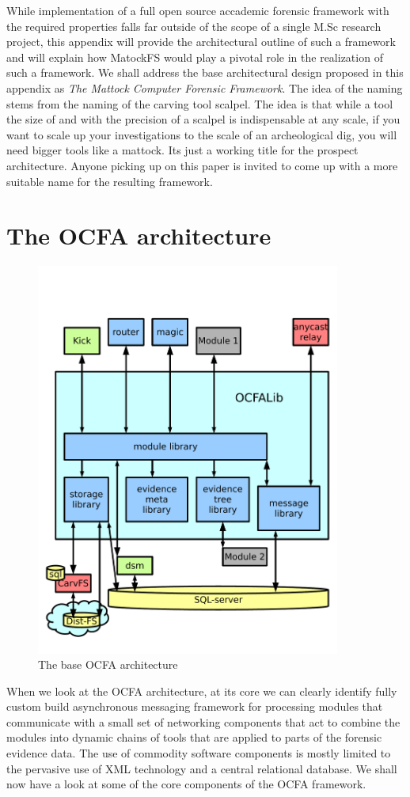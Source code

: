 While implementation of a full open source accademic forensic framework with the required properties falls far outside of the scope of a single M.Sc research project, this appendix will provide the architectural outline of such a framework and will explain how MatockFS would play a pivotal role in the realization of such a framework. We shall address the base architectural design proposed in this appendix as \emph{The Mattock Computer Forensic Framework}. The idea of the naming stems from the naming of the carving tool scalpel. The idea is that while a tool the size of and with the precision of a scalpel is indispensable at any scale, if you want to scale up your investigations to the scale of an archeological dig, you will need bigger tools like a mattock. Its just a working title for the prospect architecture. Anyone picking up on this paper is invited to come up with a more suitable name for the resulting framework. 
\section{The OCFA architecture}
\begin{figure}
\centering
\includegraphics[width=100mm]{mattock/libraryview.pdf}
\caption{The base OCFA architecture}
\label{fig:FlowInOut}
\end{figure}
When we look at the OCFA architecture, at its core we can clearly identify fully custom build asynchronous messaging framework for processing modules that communicate with a small set of networking components that act to combine the modules into dynamic chains of tools that are applied to parts of the forensic evidence data. The use of commodity software components is mostly limited to the pervasive use of XML technology and a central relational database. We shall now have a look at some of the core components of the OCFA framework.
